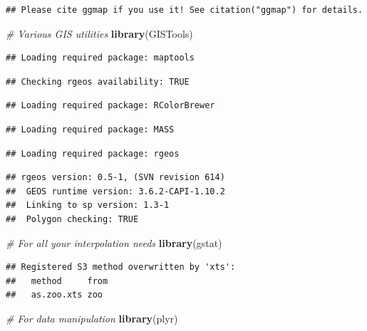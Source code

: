 \documentclass[]{book}
\newenvironment{Shaded}{\begin{snugshade}}{\end{snugshade}}
\newcommand{\CommentTok}[1]{\textcolor[rgb]{0.56,0.35,0.01}{\textit{#1}}}
\newcommand{\KeywordTok}[1]{\textcolor[rgb]{0.13,0.29,0.53}{\textbf{#1}}}
\newcommand{\NormalTok}[1]{#1}
\begin{document}
\begin{verbatim}
## Please cite ggmap if you use it! See citation("ggmap") for details.
\end{verbatim}

\begin{Shaded}
\begin{Highlighting}[]
\CommentTok{# Various GIS utilities}
\KeywordTok{library}\NormalTok{(GISTools)}
\end{Highlighting}
\end{Shaded}

\begin{verbatim}
## Loading required package: maptools
\end{verbatim}

\begin{verbatim}
## Checking rgeos availability: TRUE
\end{verbatim}

\begin{verbatim}
## Loading required package: RColorBrewer
\end{verbatim}

\begin{verbatim}
## Loading required package: MASS
\end{verbatim}

\begin{verbatim}
## Loading required package: rgeos
\end{verbatim}

\begin{verbatim}
## rgeos version: 0.5-1, (SVN revision 614)
##  GEOS runtime version: 3.6.2-CAPI-1.10.2 
##  Linking to sp version: 1.3-1 
##  Polygon checking: TRUE
\end{verbatim}

\begin{Shaded}
\begin{Highlighting}[]
\CommentTok{# For all your interpolation needs}
\KeywordTok{library}\NormalTok{(gstat)}
\end{Highlighting}
\end{Shaded}

\begin{verbatim}
## Registered S3 method overwritten by 'xts':
##   method     from
##   as.zoo.xts zoo
\end{verbatim}

\begin{Shaded}
\begin{Highlighting}[]
\CommentTok{# For data manipulation}
\KeywordTok{library}\NormalTok{(plyr)}
\end{Highlighting}
\end{Shaded}
\end{document}
